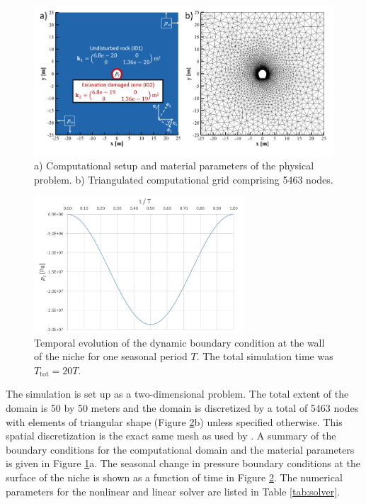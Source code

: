 \begin{figure}
\includegraphics[width=\textwidth, trim=0.4cm 0 0 0, clip]{./figures/MEX10_setup_and_grid.png}
\caption{a) Computational setup and material parameters of the physical problem. b) Triangulated computational grid comprising 5463 nodes. }
\label{fig:setup}
\end{figure}

\begin{figure}
\centering
\includegraphics[width=0.7\textwidth]{./figures/MEX10_boundary_condition_tunnel.png}
\caption{Temporal evolution of the dynamic boundary condition at the wall of the niche for one seasonal period $T$. The total simulation time was ${T_\text{tot}=20T}$.}
\label{fig:bc}
\end{figure}

The simulation is set up as a two-dimensional problem. The total extent of the domain is 50 by 50 meters and the domain is discretized by a total of 5463 nodes with elements of triangular shape (Figure \ref{fig:bc}b) unless specified otherwise. This spatial discretization is the exact same mesh as used by \cite{ziefle2018}. A summary of the boundary conditions for the computational domain and the material parameters is given in Figure \ref{fig:setup}a. The seasonal change in pressure boundary conditions at the surface of the niche is shown as a function of time in Figure \ref{fig:bc}. The numerical parameters for the nonlinear and linear solver are listed in Table \ref{tab:solver}.

